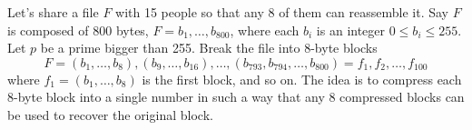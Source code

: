 \documentclass[12pt]{article}
\newcommand{\integers}{\mathbb{Z}}
\begin{document}

\noindent Let's share a file $F$ with 15 people so that any 8 of them can reassemble it. Say $F$ is composed of 800 bytes, $F = b_1, \ldots, b_{800}$, where each $b_i$ is an integer $0\leq b_i\leq 255$. Let $p$ be a prime bigger than 255. Break the file into $8$-byte blocks
\[
F = (b_1, \ldots, b_8), (b_9, \ldots, b_{16}), \ldots, (b_{793}, b_{794}, \ldots,  b_{800}) = f_1, f_2, \ldots, f_{100}
\]
where $f_1 = (b_1, \ldots, b_8)$ is the first block, and so on. The idea is to compress each $8$-byte block into a single number in such a way that any $8$ compressed blocks can be used to recover the original block.\\
\end{document}
